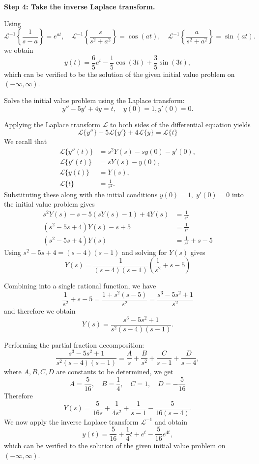 \begin{example}
\begin{solution}
	\noindent\textbf{Step 4: Take the inverse Laplace transform.}
		
		Using
		\[
		\mathscr{L}^{-1}\left\{ \frac{1}{s - a} \right\} = e^{at}, \quad
		\mathscr{L}^{-1}\left\{ \frac{s}{s^2 + a^2} \right\} = \cos(at), \quad
		\mathscr{L}^{-1}\left\{ \frac{a}{s^2 + a^2} \right\} = \sin(at).
		\]
		we obtain
		\[
		\boxed{
		y(t) = \frac{6}{5} e^t - \frac{1}{5} \cos(3t) + \frac{3}{5} \sin(3t),}
		\]
which can be verified to be the solution of the given initial value problem  on $(-\infty, \infty).$
	\end{solution}
\end{example}


\begin{example}  
	Solve the initial value problem using the Laplace transform:
	\[y''-5y'+4y= t, \quad y(0) = 1, y'(0) = 0.\]
	
	\begin{solution}
		Applying the Laplace transform $\mathscr{L}$ to both sides of the differential equation yields
		\[
		\mathscr{L}\{y''\} - 5\mathscr{L}\{y'\} + 4\mathscr{L}\{y\} = \mathscr{L}\{t\}
		\]
We recall that
		\[
		\begin{split}
		\mathscr{L}\{y''(t)\} &= s^2 Y(s) - s y(0) - y'(0),\\
		\mathscr{L}\{y'(t)\} &= s Y(s) - y(0), \\ 
		\mathscr{L}\{y(t)\} &= Y(s), \\ 
		\mathscr{L}\{t\} &= \frac{1}{s^2}.
		\end{split}
		\]	
		Substituting these along with the initial conditions 
		\(
		y(0) = 1, \; y'(0) = 0
		\) into the initial value problem
	gives
		\begin{align*}
			s^2 Y(s) - s - 5(s Y(s) - 1) + 4 Y(s) &= \frac{1}{s^2} \\
			(s^2 - 5s + 4)Y(s) - s + 5 &= \frac{1}{s^2} \\
			(s^2 - 5s + 4)Y(s) &= \frac{1}{s^2} + s - 5
		\end{align*}
	Using \(
		s^2 - 5s + 4 = (s - 4)(s - 1)
		\) and solving for $Y(s)$ gives
		\[
		Y(s) = \frac{1}{(s - 4)(s - 1)} \left( \frac{1}{s^2} + s - 5 \right)
		\]
		
		Combining into a single rational function, we have
		\[
		\frac{1}{s^2} + s - 5 = \frac{1 + s^2(s - 5)}{s^2} = \frac{s^3 - 5s^2 + 1}{s^2}
		\]
	and therefore we obtain
		\[
		Y(s) = \frac{s^3 - 5s^2 + 1}{s^2(s - 4)(s - 1)}.
		\]
		
		Performing the partial fraction decomposition:
		\[
		\frac{s^3 - 5s^2 + 1}{s^2(s - 4)(s - 1)} = \frac{A}{s} + \frac{B}{s^2} + \frac{C}{s - 1} + \frac{D}{s - 4},
		\]
		where $A,B, C, D$ are constants to be determined,  we get
		\[
		A = \frac{5}{16}, \quad B = \frac{1}{4}, \quad C = 1, \quad D = -\frac{5}{16}
		\]
		Therefore
		\[
		Y(s) = \frac{5}{16s}  +   \frac{1}{4s^2} + \frac{1}{s - 1} - \frac{5}{16(s-4)}.
		\]	
	We now apply the inverse Laplace transform $\mathscr{L}^{-1}$ and obtain
	\[
	\boxed{
		y(t) = \frac{5}{16} + \frac{1}{4} t + e^t - \frac{5}{16} e^{4t},
		}
	\]
which can be verified to the solution of the given initial value problem 
		 on $(-\infty, \infty).$
		\end{solution}
\end{example}
